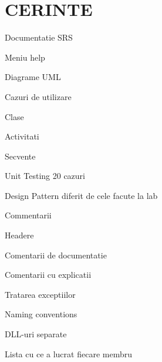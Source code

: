\chapter{CERINTE }
\hypertarget{md_CERINTE}{}\label{md_CERINTE}

\begin{DoxyItemize}
\item[\DoxyUnchecked] Documentatie SRS
\end{DoxyItemize}
\begin{DoxyItemize}
\item[\DoxyChecked] Meniu help
\item[\DoxyUnchecked] Diagrame UML
\begin{DoxyItemize}
\item[\DoxyUnchecked] Cazuri de utilizare
\end{DoxyItemize}
\begin{DoxyItemize}
\item[\DoxyUnchecked] Clase
\end{DoxyItemize}
\begin{DoxyItemize}
\item[\DoxyUnchecked] Activitati
\end{DoxyItemize}
\begin{DoxyItemize}
\item[\DoxyUnchecked] Secvente
\end{DoxyItemize}
\end{DoxyItemize}
\begin{DoxyItemize}
\item[\DoxyChecked] Unit Testing 20 cazuri
\end{DoxyItemize}
\begin{DoxyItemize}
\item[\DoxyChecked] Design Pattern diferit de cele facute la lab
\end{DoxyItemize}
\begin{DoxyItemize}
\item \+[]\+ Commentarii
\begin{DoxyItemize}
\item \+[]\+ Headere
\item \+[]\+ Comentarii de documentatie
\item \+[]\+ Comentarii cu explicatii
\end{DoxyItemize}
\end{DoxyItemize}
\begin{DoxyItemize}
\item[\DoxyChecked] Tratarea exceptiilor
\end{DoxyItemize}
\begin{DoxyItemize}
\item[\DoxyChecked] Naming conventions
\end{DoxyItemize}
\begin{DoxyItemize}
\item[\DoxyChecked] DLL-\/uri separate
\item[\DoxyUnchecked] Lista cu ce a lucrat fiecare membru 
\end{DoxyItemize}
